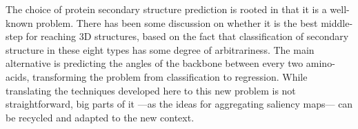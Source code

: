 The choice of protein secondary structure prediction is rooted in that it is a well-known problem. There has been some discussion on whether it is the best middle-step for reaching 3D structures, based on the fact that classification of secondary structure in these eight types has some degree of arbitrariness. The main alternative is predicting the angles of the backbone between every two amino-acids, transforming the problem from classification to regression. While translating the techniques developed here to this new problem is not straightforward, big parts of it ---as the ideas for aggregating saliency maps--- can be recycled and adapted to the new context.


